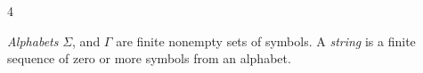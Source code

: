 \documentclass[letterpaper,landscape,11pt]{article}
\let\Begin\begin
\let\End\end
\begin{document}
\date{}

\Begin{multicols}{4}

\emph{Alphabets} $\Sigma$, and $\Gamma$ are finite nonempty sets of symbols. A \emph{string} is a finite sequence of zero or more symbols from an alphabet.

\lipsum
\lipsum
	
\End{multicols}
\end{document}
